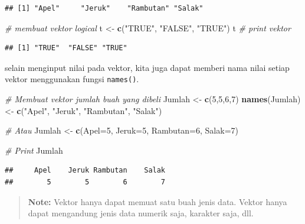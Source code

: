 \documentclass[]{book}
\newenvironment{Shaded}{\begin{snugshade}}{\end{snugshade}}
\newcommand{\KeywordTok}[1]{\textcolor[rgb]{0.13,0.29,0.53}{\textbf{#1}}}
\newcommand{\DataTypeTok}[1]{\textcolor[rgb]{0.13,0.29,0.53}{#1}}
\newcommand{\DecValTok}[1]{\textcolor[rgb]{0.00,0.00,0.81}{#1}}
\newcommand{\StringTok}[1]{\textcolor[rgb]{0.31,0.60,0.02}{#1}}
\newcommand{\CommentTok}[1]{\textcolor[rgb]{0.56,0.35,0.01}{\textit{#1}}}
\newcommand{\NormalTok}[1]{#1}
\begin{document}
\begin{verbatim}
## [1] "Apel"     "Jeruk"    "Rambutan" "Salak"
\end{verbatim}

\begin{Shaded}
\begin{Highlighting}[]
\CommentTok{# membuat vektor logical}
\NormalTok{t <-}\StringTok{ }\KeywordTok{c}\NormalTok{(}\StringTok{"TRUE"}\NormalTok{, }\StringTok{"FALSE"}\NormalTok{, }\StringTok{"TRUE"}\NormalTok{)}
\NormalTok{t }\CommentTok{# print vektor}
\end{Highlighting}
\end{Shaded}

\begin{verbatim}
## [1] "TRUE"  "FALSE" "TRUE"
\end{verbatim}

selain menginput nilai pada vektor, kita juga dapat memberi nama nilai
setiap vektor menggunakan fungsi \texttt{names()}.

\begin{Shaded}
\begin{Highlighting}[]
\CommentTok{# Membuat vektor jumlah buah yang dibeli}
\NormalTok{Jumlah <-}\StringTok{ }\KeywordTok{c}\NormalTok{(}\DecValTok{5}\NormalTok{,}\DecValTok{5}\NormalTok{,}\DecValTok{6}\NormalTok{,}\DecValTok{7}\NormalTok{)}
\KeywordTok{names}\NormalTok{(Jumlah) <-}\StringTok{ }\KeywordTok{c}\NormalTok{(}\StringTok{"Apel"}\NormalTok{, }\StringTok{"Jeruk"}\NormalTok{, }\StringTok{"Rambutan"}\NormalTok{, }\StringTok{"Salak"}\NormalTok{)}

\CommentTok{# Atau}
\NormalTok{Jumlah <-}\StringTok{ }\KeywordTok{c}\NormalTok{(}\DataTypeTok{Apel=}\DecValTok{5}\NormalTok{, }\DataTypeTok{Jeruk=}\DecValTok{5}\NormalTok{, }\DataTypeTok{Rambutan=}\DecValTok{6}\NormalTok{, }\DataTypeTok{Salak=}\DecValTok{7}\NormalTok{)}

\CommentTok{# Print}
\NormalTok{Jumlah}
\end{Highlighting}
\end{Shaded}

\begin{verbatim}
##     Apel    Jeruk Rambutan    Salak 
##        5        5        6        7
\end{verbatim}

\begin{quote}
\textbf{Note: } Vektor hanya dapat memuat satu buah jenis data. Vektor
hanya dapat mengandung jenis data numerik saja, karakter saja, dll.
\end{quote}
\end{document}
